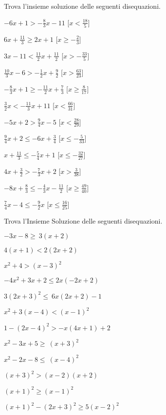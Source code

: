 \begin{esercizio}\label{ese:dis_13}
 Trova l'insieme soluzione delle seguenti disequazioni.
\begin{multicols}{2}
 \begin{enumeratea}
  \item  $-6 x +1 > -\frac{8}{3} x -11$ \hfill 
  [$x < \frac{18}{5}$]
  \item  $6 x +\frac{11}{3} \ge 2 x +1$ \hfill 
  [$x \ge -\frac{2}{3}$]
  \item  $3 x -11 < \frac{11}{2} x +\frac{11}{2}$ \hfill 
  [$x > -\frac{33}{5}$]
  \item  $\frac{10}{3} x -6 > -\frac{1}{2} x +\frac{9}{2}$ \hfill 
  [$x > \frac{63}{23}$]
  \item  $-\frac{8}{3} x +1 \ge -\frac{11}{2} x +\frac{7}{3}$ \hfill 
  [$x \ge \frac{8}{17}$]
  \item  $\frac{3}{2} x  < -\frac{11}{3} x +11$ \hfill 
  [$x < \frac{66}{31}$]
  \item  $-5 x +2 > \frac{9}{4} x -5$ \hfill 
  [$x < \frac{28}{29}$]
  \item  $\frac{9}{4} x +2 \le -6 x +\frac{3}{4}$ \hfill 
  [$x \le -\frac{5}{33}$]
  \item  $x +\frac{11}{3} \le -\frac{5}{4} x +1$ \hfill 
  [$x \le -\frac{32}{27}$]
  \item  $4 x +\frac{3}{2} > -\frac{7}{3} x +2$ \hfill 
  [$x > \frac{3}{38}$]
  \item  $-8 x +\frac{8}{3} \le -\frac{4}{3} x -\frac{11}{2}$ \hfill 
  [$x \ge \frac{49}{40}$]
  \item  $\frac{7}{4} x -4 \le -\frac{9}{2} x $ \hfill 
  [$x \le \frac{16}{25}$]
 \end{enumeratea}
\end{multicols}
\end{esercizio}

\begin{esercizio}[]
 \label{ese:dis_12}
Trova l'Insieme Soluzione delle seguenti disequazioni.
 \begin{multicols}{2}
 \begin{enumeratea}
\item $-3x-8 \ge~3(x+2)$
\item $4(x+1) < 2(2x+2)$
\item $x^{2}+4 > (x-3)^2$
\item $-4x^2 +3x+2 \le 2x(-2x+2)$
\item $3(2x+3)^2 \le~6x(2x+2)-1$
\item $x^{2}+3(x-4) < (x-1)^2$
\item $1-(2x-4)^{2} > -x(4x+1)+2$
\item $x^2-3x+5 \ge~(x+3)^2$
\item $x^2-2x-8 \le~(x-4)^2$
\item $(x+3)^{2} > (x-2)(x+2)$
\item $(x+1)^{2} \ge (x-1)^{2}$
\item $(x+1)^{2}-(2x +3)^2 \ge 5(x-2)^{2}$
\end{enumeratea}
\end{multicols}
\end{esercizio}

